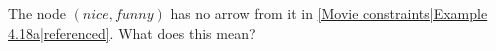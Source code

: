 
The node $(nice,funny)$ has no arrow from it in \ref{Movie constraints|Example 4.18a|referenced}. What does this mean?